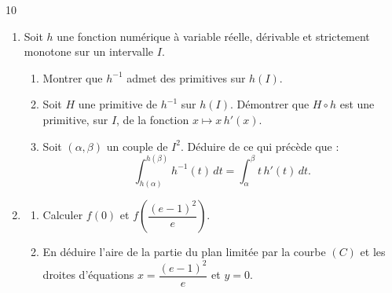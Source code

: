 \documentclass{axiobac}
\begin{document}
\begin{probleme}{10}
\begin{enumerate}
    \item Soit $h$ une fonction numérique à variable réelle, dérivable et strictement monotone sur un intervalle $I$.
    \begin{enumerate}
        \item Montrer que $h^{-1}$ admet des primitives sur $h(I)$.
        \item Soit $H$ une primitive de $h^{-1}$ sur $h(I)$. Démontrer que $H \circ h$ est une primitive, sur $I$, de la fonction $x \longmapsto x\,h'(x)$.
        \item Soit $(\alpha, \beta)$ un couple de $I^2$. Déduire de ce qui précède que :
        \[
        \int_{h(\alpha)}^{h(\beta)} h^{-1}(t)\,dt = \int_\alpha^\beta t\,h'(t)\,dt .
        \]
    \end{enumerate}
    \item
    \begin{enumerate}
        \item Calculer $f(0)$ et $f\left(\dfrac{(e - 1)^2}{e}\right)$.
        \item En déduire l'aire de la partie du plan limitée par la courbe $(C)$ et les droites d'équations $x = \dfrac{(e - 1)^2}{e}$ et $y = 0$.
    \end{enumerate}
\end{enumerate}



\end{probleme}
\end{document}
